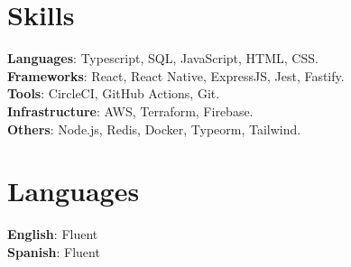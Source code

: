 \documentclass[letterpaper,11pt]{article}
\makeatletter
\newcommand{\resumeSubheading}[4]{
  \vspace{-2pt}\item
    \begin{tabular*}{0.97\textwidth}[t]{l@{\extracolsep{\fill}}r}
      \textbf{#1} & #2 \\
      \textit{\small#3} & \textit{\small #4} \\
    \end{tabular*}\vspace{-7pt}
}
\newcommand{\resumeSimpleSubheading}[2]{
  \vspace{-2pt}\item
    \begin{tabular*}{0.97\textwidth}[t]{l@{\extracolsep{\fill}}r}
      \small\textbf{#1} & #2 \\
    \end{tabular*}\vspace{-7pt}
}
\newcommand{\resumeSubHeadingListStart}{\begin{itemize}[leftmargin=0.15in, label={}]}
\newcommand{\resumeSubHeadingListEnd}{\end{itemize}}
\makeatother
\begin{document}
\begin{minipage}[t]{.78\textwidth}
  \section{Skills}
  \begin{itemize}[leftmargin=0.15in, label={}]
      \small{\item{
      \textbf{Languages}{: Typescript, SQL, JavaScript, HTML, CSS.} \\
      \textbf{Frameworks}{: React, React Native, ExpressJS, Jest, Fastify.} \\
      \textbf{Tools}{: CircleCI, GitHub Actions, Git.} \\
      \textbf{Infrastructure}{: AWS, Terraform, Firebase.} \\
      \textbf{Others}{: Node.js, Redis, Docker, Typeorm, Tailwind.} \\
      }}
  \end{itemize}
\end{minipage}\hspace{.02\textwidth}%
\begin{minipage}[t]{.20\textwidth}
  \section{Languages}
  \begin{itemize}[leftmargin=0.0in, label={}]
      \small{\item{
      \textbf{English}{: Fluent} \\
      \textbf{Spanish}{: Fluent} \\
      }}
  \end{itemize}
\end{minipage}\vspace{-10pt}



\end{document}
